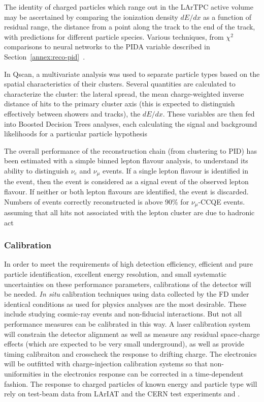 
The identity of charged particles which range out in the LArTPC active
volume may be ascertained by comparing the ionization density $dE/dx$ as a function
of residual range, the distance from a point along the track to the end of the
track, with predictions for different particle species.  Various techniques,
from $\chi^2$ comparisons to neural networks to the PIDA variable described
in Section~\ref{annex:reco-pid}~\cite{Acciarri:2013met}.
 
In Qscan, a multivariate analysis was used to separate particle types based on the spatial characteristics of their clusters.
Several quantities are calculated to 
characterize the cluster: the lateral spread, the mean charge-weighted inverse distance of hits to the primary cluster axis
(this is expected to distinguish effectively between showers and tracks), the $dE/dx$.
These variables are then fed into Boosted Decision Trees analyses, 
each calculating the signal and background likelihoods for a particular particle hypothesis

The overall performance of the reconstruction chain (from clustering to PID) has been estimated with a simple binned lepton flavour analysis, 
to understand its ability to distinguish $\nu_{e}$ and $\nu_{\mu}$ events.
If a single lepton flavour is identified in the event, then the event is considered as a signal event of the observed lepton flavour. 
If neither or both lepton flavours are identified, the event is discarded.
Numbers of events correctly reconstructed is above 90$\%$ for $\nu_{\mu}$-CCQE events.
assuming that all hits not associated with the lepton cluster are due to hadronic act%


\subsubsection{Calibration}

In order to meet the requirements of high detection efficiency, efficient and
pure particle identification, excellent energy resolution, and small systematic
uncertainties on these performance parameters, calibrations of the detector
will be needed.  {\it In situ} calibration techniques using data collected by the FD
under identical conditions as used for physics analyses are the most desirable.
These include studying cosmic-ray events and non-fiducial interactions.  But not
all performance measures can be calibrated in this way.  A laser calibration system
will constrain the detector alignment as well as measure any residual space-charge effects
(which are expected to be very small underground), as well as provide timing calibraiton
and crosscheck the response to drifting charge.  The electronics will be outfitted with
charge-injection calibration systems so that non-uniformities in the electronics response
can be corrected in a time-dependent fashion.  The response to charged particles of known
energy and particle type will rely on test-beam data from LArIAT and the CERN test
experiments \cernsingleproto{} and \cerndualproto.
